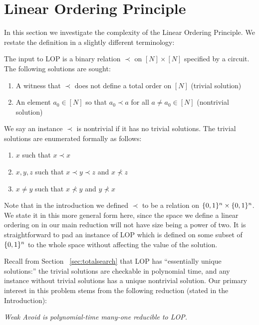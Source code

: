 \section{{\sc Linear Ordering Principle}}\label{sec:lop}
In this section we investigate the complexity of the {\sc Linear Ordering Principle}. We restate the definition in a slightly different terminology:
\begin{definition*}
The input to {\sc LOP} is a binary relation $\prec$ on $[N] \times [N]$ specified by a circuit. The following solutions are sought:
\begin{enumerate}
    \item A witness that $\prec$ does not define a total order on $[N]$ (trivial solution)
    \item An element $a_0 \in [N]$ so that $a_0 \prec a$ for all $a \neq a_0 \in [N]$ (nontrivial solution)
\end{enumerate}
We say an instance $\prec$ is nontrivial if it has no trivial solutions. The trivial solutions are enumerated formally as follows:
\begin{enumerate}[leftmargin=8.5\parindent]
    \item[\textbf{Antireflexivity Violation:}] $x$ such that $x \prec x$
    \item[\textbf{Transitivity Violation:}] $x,y,z$ such that $x \prec y \prec z$ and $x \not\prec z$
    \item[\textbf{Totality Violation:}] $x\neq y$ such that $x \not\prec y$ and $y \not\prec x$
\end{enumerate}
\end{definition*}
Note that in the introduction we defined $\prec$ to be a relation on $\{0,1\}^n \times \{0,1\}^n$. We state it in this more general form here, since the space we define a linear ordering on in our main reduction will not have size being a power of two. It is straightforward to pad an instance of {\sc LOP} which is defined on some subset of $\{0,1\}^n$ to the whole space without affecting the value of the solution.

Recall from Section ~\ref{sec:totalsearch}
that {\sc LOP} has ``essentially unique solutions:'' the trivial solutions are checkable in polynomial time, and any instance without trivial solutions has a unique nontrivial solution. Our primary interest in this problem stems from the following reduction (stated in the Introduction):
\medskip

{\it {\sc Weak Avoid} is polynomial-time many-one reducible to {\sc LOP}.}


